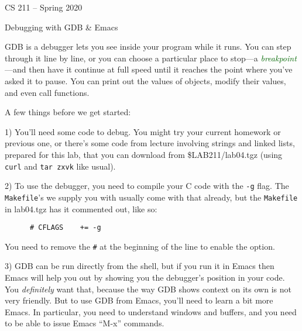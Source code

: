 \documentclass[11pt]{article}
\newcommand\keyterm[1]{\textcolor[HTML]{006600}{\emph{#1}}}
\def\LabTGZ{\$LAB211/lab04.tgz}
\begin{document}
%

\begin{center}
  \sffamily
  CS 211 – Spring 2020
  \par
  \Huge
  Debugging
  \Large
  with GDB \& Emacs
\end{center}

\begin{multicols}{2}

GDB is a debugger lets you see inside your program while it runs. You
  can step through it line by line, or you can choose a particular place
  to stop—a \keyterm{breakpoint}—and then have it continue at full speed
  until it reaches the point where you’ve asked it to pause. You can
  print out the values of objects, modify their values, and even call
  functions.

  A few things before we get started:


      1) You’ll need some code to debug. You might try your current
      homework or previous one, or there’s some code from lecture
      involving strings and linked lists, prepared for this lab, that
      you can download from \textsf{\LabTGZ} (using \verb!curl! and
      \verb!tar zxvk! like usual).

      2) To use the debugger, you need to compile your C code with the
      \verb!-g! flag. The \verb!Makefile!'s we supply you with usually
      come with that already, but the \verb!Makefile! in
      \textsf{lab04.tgz} has it commented out, like so:

      \begin{verbatim}
      # CFLAGS    += -g\end{verbatim}

      You need to remove the \verb!#! at the beginning of the line to
      enable the option.

      3) GDB can be run directly from the shell, but if you run it
      in Emacs then Emacs will help you out by showing you the
      debugger’s position in your code. You \emph{definitely} want that,
      because the way GDB shows context on its own
      is not very friendly. But to use GDB from Emacs, you’ll need to
      learn a bit more Emacs. In particular, you need to understand
      windows and buffers, and you need to be able to issue Emacs
      “\textsf{M-x}” commands.



\end{multicols}
\end{document}
